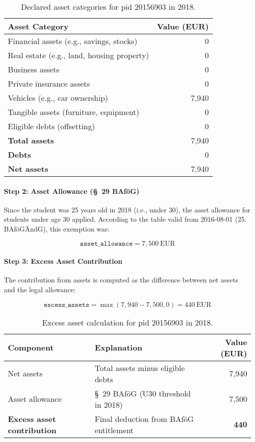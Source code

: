 \begin{table}[H]
\scriptsize
\centering
\begin{tabular}{lr}
\toprule
\textbf{Asset Category} & \textbf{Value (EUR)} \\
\midrule
Financial assets (e.g., savings, stocks) & 0 \\
Real estate (e.g., land, housing property) & 0 \\
Business assets & 0 \\
Private insurance assets & 0 \\
Vehicles (e.g., car ownership) & 7,940 \\
Tangible assets (furniture, equipment) & 0 \\
Eligible debts (offsetting) & 0 \\
\midrule
\textbf{Total assets} & 7,940 \\
\textbf{Debts} & 0 \\
\textbf{Net assets} & 7,940 \\
\bottomrule
\end{tabular}
\caption{Declared asset categories for pid 20156903 in 2018.}
\label{table:bafoeg_declared_assets}
\end{table}

\paragraph{Step 2: Asset Allowance (§~29 BAföG)}

Since the student was 25 years old in 2018 (i.e., under 30), the asset allowance for students under age 30 applied. According to the table valid from 2016-08-01 (25. BAföGÄndG), this exemption was:

\[
\texttt{asset\_allowance} = 7{,}500~\text{EUR}
\]

\paragraph{Step 3: Excess Asset Contribution}

The contribution from assets is computed as the difference between net assets and the legal allowance:

\[
\texttt{excess\_assets} = \max(7{,}940 - 7{,}500, 0) = 440~\text{EUR}
\]

\begin{table}[H]
\scriptsize
\centering
\begin{tabular}{llr}
\toprule
\textbf{Component} & \textbf{Explanation} & \textbf{Value (EUR)} \\
\midrule
Net assets & Total assets minus eligible debts & 7,940 \\
Asset allowance & §~29 BAföG (U30 threshold in 2018) & 7,500 \\
\textbf{Excess asset contribution} & Final deduction from BAföG entitlement & \textbf{440} \\
\bottomrule
\end{tabular}
\caption{Excess asset calculation for pid 20156903 in 2018.}
\label{table:bafoeg_excess_assets}
\end{table}


